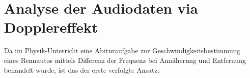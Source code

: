 \section{Analyse der Audiodaten via Dopplereffekt}
Da im Physik-Unterricht eine Abituraufgabe zur Geschwindigkeitsbestimmung eines Rennautos mittels Differenz der Frequenz bei Annäherung und Entfernung behandelt wurde, ist das der erste verfolgte Ansatz.